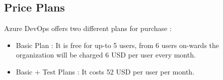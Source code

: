 \subsection{Price Plans}
%
   Azure DevOps offers two different plans for purchase :
   \begin{itemize}
     \item Basic Plan : It is free for up-to 5 users, from 6 users on-wards the organization will be charged 6 USD per user every month.
     \item Basic + Test Plans : It costs 52 USD per user per month. 
   \end{itemize}
%